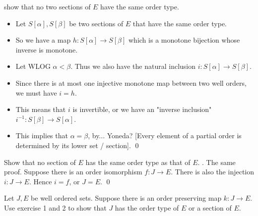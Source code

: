 \documentclass{article}
\begin{document}
 show that no two sections of $E$ have the same order type.
\begin{itemize}
        \item Let $S[\alpha], S[\beta]$ be two sections of $E$ that have the same order type. 
        \item So we have a map $h: S[\alpha] \rightarrow S[\beta]$ which is a monotone bijection whose inverse is monotone. 
        \item Let WLOG $\alpha < \beta$. Thus we also have the natural inclusion $i: S[\alpha] \rightarrow S[\beta]$. 
        \item Since there is at most one injective monotone map between two
            well orders, we must have $i = h$.
        \item This means that $i$ is invertible, or we have an "inverse inclusion" $i^{-1}: S[\beta] \rightarrow S[\alpha]$.
        \item This implies that $\alpha = \beta$, by... Yoneda? [Every element of a partial order is determined by its lower set / section]. \qed
\end{itemize}

 Show that no section of $E$ has the same order type as that of $E$. 
. The same proof. Suppose there is an order isomorphism $f: J
\rightarrow E$. There is also the injection $i: J \rightarrow E$. Hence $i = f$, or $J = E$. \qed

 Let $J, E$ be well ordered sets. Suppose there is an order preserving map $k: J \rightarrow E$. Use exercise 1 and 2 to show that $J$ has the order
type of $E$ or a section of $E$.
\end{document}
